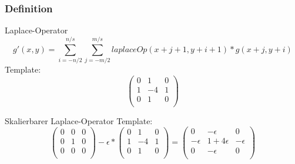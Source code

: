 \documentclass[aspectratio=169]{beamer}
\begin{document}
\begin{frame}
    \frametitle{Definition}
    \begin{center}
    \begin{alertblock}
        {Laplace-Operator}
        \begin{equation}
            g'(x,y)=\sum_{i=-n/2}^{n/s}\sum_{j=-m/2}^{m/s}laplaceOp(x+j+1,y+i+1)*g(x+j,y+i)
        \end{equation}
        Template:
        \begin{equation}
            \begin{pmatrix}
                0 &  1 & 0 \\
                1 & -4 & 1 \\
                0 &  1 & 0 \\
            \end{pmatrix}
        \end{equation}
    \end{alertblock}
    \begin{alertblock}
        {Skalierbarer Laplace-Operator}
        Template:
        \begin{equation}
            \begin{pmatrix}
                0 & 0 & 0 \\
                0 & 1 & 0 \\
                0 & 0 & 0 \\
            \end{pmatrix} - \epsilon *
            \begin{pmatrix}
                0 &  1 & 0 \\
                1 & -4 & 1 \\
                0 &  1 & 0 \\
            \end{pmatrix} = 
            \begin{pmatrix}
                0 &  -\epsilon & 0 \\
                -\epsilon & 1+4\epsilon & -\epsilon \\
                0 &  -\epsilon & 0 \\
            \end{pmatrix} 
        \end{equation}
    \end{alertblock}
    \end{center}
\end{frame}
\end{document}
